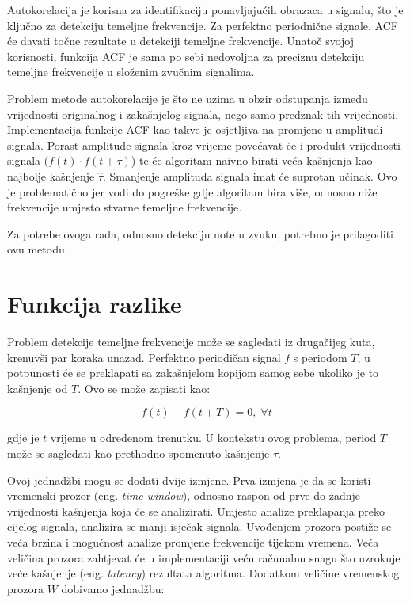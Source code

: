 \documentclass[times, utf8, diplomski, numeric]{fer}
\begin{document}
Autokorelacija je korisna za identifikaciju ponavljajućih obrazaca u signalu, što je ključno za detekciju temeljne frekvencije. Za perfektno periodnične signale, ACF će davati točne rezultate u detekciji temeljne frekvencije. Unatoč svojoj korisnosti, funkcija ACF je sama po sebi nedovoljna za preciznu detekciju temeljne frekvencije u složenim zvučnim signalima.

Problem metode autokorelacije je što ne uzima u obzir odstupanja između vrijednosti originalnog i zakašnjelog signala, nego samo predznak tih vrijednosti. Implementacija funkcije ACF kao takve je osjetljiva na promjene u amplitudi signala. Porast amplitude signala kroz vrijeme povećavat će i produkt vrijednosti signala ($f(t) \cdot f(t + \tau)$) te će algoritam naivno birati veća kašnjenja kao najbolje kašnjenje $\hat{\tau}$. Smanjenje amplituda signala imat će suprotan učinak. Ovo je problematično jer vodi do pogreške gdje algoritam bira više, odnosno niže frekvencije umjesto stvarne temeljne frekvencije.

Za potrebe ovoga rada, odnosno detekciju note u zvuku, potrebno je prilagoditi ovu metodu.
\clearpage
\section{Funkcija razlike}
%
Problem detekcije temeljne frekvencije može se sagledati iz drugačijeg kuta, krenuvši par koraka unazad. Perfektno periodičan signal $f$ s periodom $T$, u potpunosti će se preklapati sa zakašnjelom kopijom samog sebe ukoliko je to kašnjenje od $T$. Ovo se može zapisati kao:

\begin{equation}
	f(t) - f(t + T) = 0, \; \forall t
\end{equation}

gdje je $t$ vrijeme u određenom trenutku. U kontekstu ovog problema, period $T$ može se sagledati kao prethodno spomenuto kašnjenje $\tau$.

Ovoj jednadžbi mogu se dodati dvije izmjene. Prva izmjena je da se koristi vremenski prozor (eng. \textit{time window}), odnosno raspon od prve do zadnje vrijednosti kašnjenja koja će se analizirati. Umjesto analize preklapanja preko cijelog signala, analizira se manji isječak signala. Uvođenjem prozora postiže se veća brzina i mogućnost analize promjene frekvencije tijekom vremena. Veća veličina prozora zahtjevat će u implementaciji veću računalnu snagu što uzrokuje veće kašnjenje (eng. \textit{latency}) rezultata algoritma. Dodatkom veličine vremenskog prozora $W$ dobivamo jednadžbu:
\end{document}
